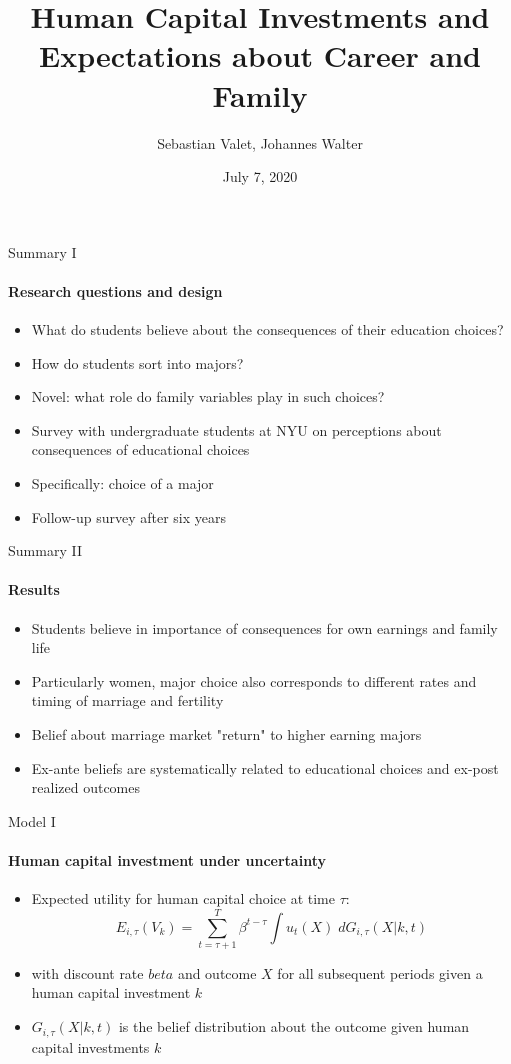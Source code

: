 \documentclass[12pt]{beamer}
\author{Sebastian Valet, Johannes Walter}
\title{Human Capital Investments and Expectations about Career and Family}
\date{July 7, 2020}
\begin{document}
\begin{frame}
\titlepage
\end{frame}


\begin{frame}{Summary I}
    \framesubtitle{Research questions and design}
        \begin{itemize}
            \item What do students believe about the consequences of their education choices?
            \item How do students sort into majors?
            \item Novel: what role do family variables play in such choices?
        \end{itemize}
    \vspace{0.5cm}
        \begin{itemize}
            \item Survey with undergraduate students at NYU on perceptions about consequences of educational choices
            \item Specifically: choice of a major
            \item Follow-up survey after six years
        \end{itemize}
\end{frame}

\begin{frame}{Summary II}
    \framesubtitle{Results}
    \begin{itemize}
        \item Students believe in importance of consequences for own earnings and family life
        \item Particularly women, major choice also corresponds to different rates and timing of marriage and fertility
        \item Belief about marriage market "return" to higher earning majors
        \item Ex-ante beliefs are systematically related to educational choices and ex-post realized outcomes
    \end{itemize}
\end{frame}

\begin{frame}{Model I}
    \framesubtitle{Human capital investment under uncertainty}
    \begin{itemize}
        \item Expected utility for human capital choice at time $\tau$: 
        $$ E_{i,\tau}(V_k) = \sum_{t = \tau + 1}^{T} \beta^{t - \tau}  \int u_t(X) \; dG_{i,\tau}(X|k,t) $$
        \item with discount rate $beta$ and outcome $X$ for all subsequent periods given a human capital investment $k$
        \item $G_{i,\tau}(X|k,t)$ is the belief distribution about the outcome given human capital investments $k$
    \end{itemize}   
\end{frame}
\end{document}
